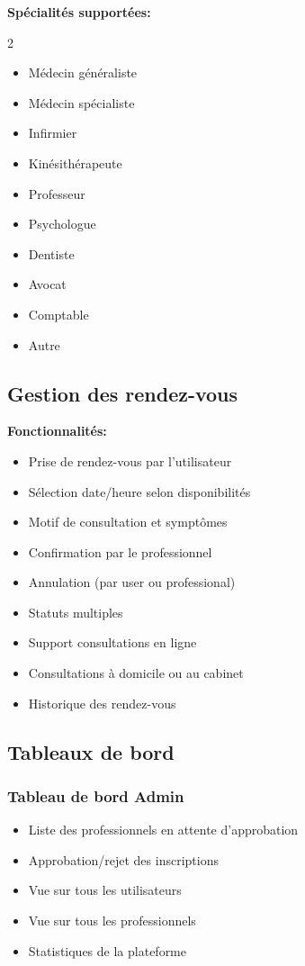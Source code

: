 \documentclass[12pt,a4paper]{article}
\begin{document}
\textbf{Spécialités supportées:}
\begin{multicols}{2}
\begin{itemize}
    \item Médecin généraliste
    \item Médecin spécialiste
    \item Infirmier
    \item Kinésithérapeute
    \item Professeur
    \item Psychologue
    \item Dentiste
    \item Avocat
    \item Comptable
    \item Autre
\end{itemize}
\end{multicols}

\subsection{Gestion des rendez-vous}

\textbf{Fonctionnalités:}
\begin{itemize}
    \item[\checkmark] Prise de rendez-vous par l'utilisateur
    \item[\checkmark] Sélection date/heure selon disponibilités
    \item[\checkmark] Motif de consultation et symptômes
    \item[\checkmark] Confirmation par le professionnel
    \item[\checkmark] Annulation (par user ou professional)
    \item[\checkmark] Statuts multiples
    \item[\checkmark] Support consultations en ligne
    \item[\checkmark] Consultations à domicile ou au cabinet
    \item[\checkmark] Historique des rendez-vous
\end{itemize}

\subsection{Tableaux de bord}

\subsubsection{Tableau de bord Admin}
\begin{itemize}
    \item[\checkmark] Liste des professionnels en attente d'approbation
    \item[\checkmark] Approbation/rejet des inscriptions
    \item[\checkmark] Vue sur tous les utilisateurs
    \item[\checkmark] Vue sur tous les professionnels
    \item[\checkmark] Statistiques de la plateforme
\end{itemize}
\end{document}
